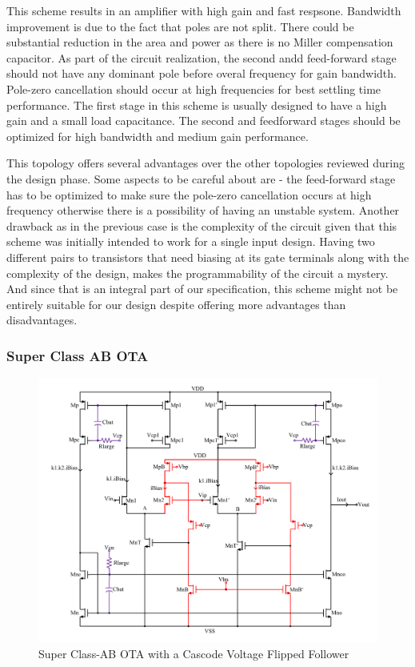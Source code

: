 This scheme results in an amplifier with high gain and fast respsone. Bandwidth improvement is due to the fact that poles are not split. There could be substantial reduction in the area and power as there is no Miller compensation capacitor. As part of the circuit realization, the second andd feed-forward stage should not have any dominant pole before overal frequency for gain bandwidth. Pole-zero cancellation should occur at high frequencies for best settling time performance. The first stage in this scheme is usually designed to have a high gain and a small load capacitance. The second and feedforward stages should be optimized for high bandwidth and medium gain performance.

This topology offers several advantages over the other topologies reviewed during the design phase. Some aspects to be careful about are - the feed-forward stage has to be optimized to make sure the pole-zero cancellation occurs at high frequency otherwise there is a possibility of having an unstable system. Another drawback as in the previous case is the complexity of the circuit given that this scheme was initially intended to work for a single input design. Having two different pairs to transistors that need biasing at its gate terminals along with the complexity of the design, makes the programmability of the circuit a mystery. And since that is an integral part of our specification, this scheme might not be entirely suitable for our design despite offering more advantages than disadvantages.

\subsubsection{Super Class AB OTA}
\begin{figure} [H]
\centering
\includegraphics[scale=0.65]{Figures/Schematics/OTA_Class_AB.pdf}
\caption{Super Class-AB OTA with a Cascode Voltage Flipped Follower}
\label{fig:OTA_Class_AB}
\end{figure}

